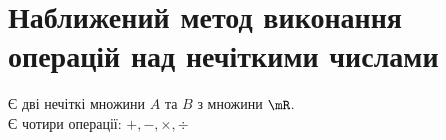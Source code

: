 \section{Наближений метод виконання операцій над нечіткими числами}
Є дві нечіткі множини $A$ та $B$ з множини $\mR$.\\
Є чотири операції: $+,-,\times,\div$\\
